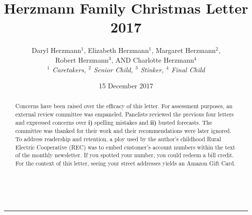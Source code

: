 \documentclass[letterpaper,11pt]{article}
\title{\vspace{-2.0cm}Herzmann Family Christmas Letter 2017}
\author{Daryl Herzmann${}^1$, Elizabeth Herzmann${}^1$, Margaret 
Herzmann${}^2$,\\
Robert Herzmann${}^3$, AND Charlotte Herzmann${}^4$ \\
\it{${}^1$ Caretakers},
\it{${}^2$ Senior Child},
\it{${}^3$ Stinker},
\it{${}^4$ Final Child}}
\date{15 December 2017}
\newcommand{\Line}[0]{%
  \rule{0cm}{0cm}\\\hrule\rule{0cm}{0cm}%
}
\begin{document}
\maketitle
\vspace{-0.75cm}
\begin{abstract}
Concerns have been raised over the efficacy of this letter. For assessment
purposes, an external review committee was empaneled.  Panelists reviewed the
previous four letters and expressed concerns over \textbf{i)} spelling mistakes
and \textbf{ii)} busted forecasts.  The committee was thanked for their work and
their recommendations were later ignored.  To address readership and retention,
a ploy used by the author's childhood Rural Electric Cooperative (REC) was to
embed customer's account numbers within the text of the monthly newsletter.  If
you spotted your number, you could redeem a bill credit.  For the context of this
letter, seeing your street addresses yields an Amazon Gift Card.
\end{abstract}

\vspace{-0.5cm}
\Line
\end{document}
